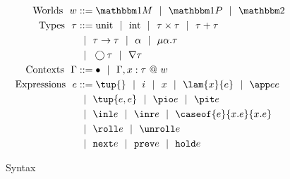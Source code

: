 
\begin{figure}
\begin{abstrsyn}
\[\begin{aligned}
\text{Worlds}\ \ 
\world &::= \bbonem \gbar \bbonep \gbar \bbtwo  \\
%
\text{Types}\ \ 
\type &::= \text{unit}\gbar\text{int}%
 \gbar \type \times \type
 \gbar \type + \type \\
&\gbar \type \to \type
 \gbar \alpha \gbar \mu \alpha.\tau \\
&\gbar \fut \type 
 \gbar \curr \type \\
%
\text{Contexts}\ \ 
\context &::=\emptyC
 \gbar \context, x:\tau~@~w \\
%
\text{Expressions}\ \ 
\expr &::= \tup{}\gbar\inte\gbar\var%
 \gbar \lam {\var}{\expr} 
 \gbar \app \expr \expr \\
&\gbar \tup{\expr, \expr} 
 \gbar \pio \expr 
 \gbar \pit \expr \\
&\gbar \inl \expr 
 \gbar \inr \expr
 \gbar \caseof {\expr}{\var.\expr}{\var.\expr}
\\ %
&\gbar \roll e
 \gbar \unroll e\\
&\gbar \next \expr 
 \gbar \prev \expr 
 \gbar \pause \expr \\
\end{aligned}\]
\end{abstrsyn}
\caption{\lang~Syntax}
\label{fig:grammar}
\end{figure}